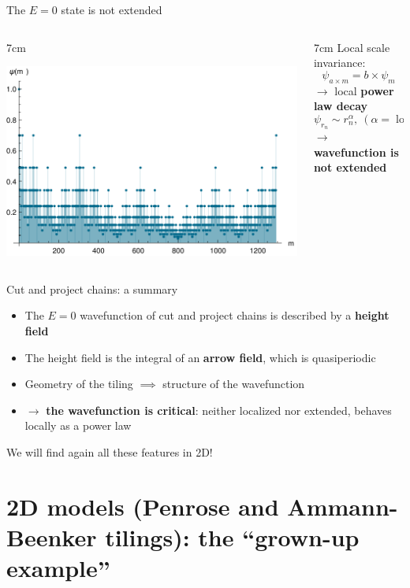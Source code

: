 \documentclass[xcolor=x11names,compress,professionalfonts, aspectratio=169]{beamer}
\renewcommand{\(}{\begin{columns}}
\renewcommand{\)}{\end{columns}}
\newcommand{\<}[1]{\begin{column}{#1}}
\renewcommand{\>}{\end{column}}
\begin{document}
\begin{frame}{The $E=0$ state is not extended}
{

\centering

}

\begin{columns}
\<{7cm}
{\centering
\includegraphics[scale=.5]{img/wavefunction.pdf}

}
\>

\<{7cm}
Local scale invariance:
\[
	\psi_{a \times m} = b \times \psi_{m} 
\]
$\rightarrow$ local \textbf{power law decay}
\[
\psi_{r_n} \sim r_n^\alpha, ~(\alpha = \log b/\log a)
\]
$\rightarrow$ \textbf{wavefunction is not extended}
\>
\end{columns}

\end{frame}

\begin{frame}{Cut and project chains: a summary}
\begin{itemize}
	\item The $E=0$ wavefunction of cut and project chains is described by a \textbf{height field}
	\item The height field is the integral of an \textbf{arrow field}, which is quasiperiodic
	\item Geometry of the tiling $\implies$ structure of the wavefunction
	\item $\rightarrow$ \textbf{the wavefunction is critical}: neither localized nor extended, behaves locally as a power law
\end{itemize}
We will find again all these features in 2D!
\end{frame}

\section{2D models (Penrose and Ammann-Beenker tilings): the ``grown-up example''}
\end{document}
